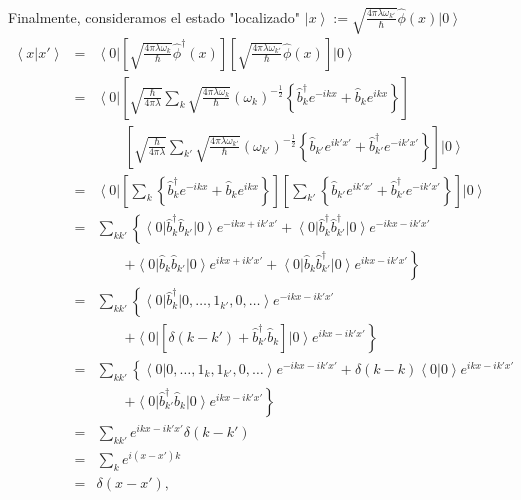 Finalmente, consideramos el estado "localizado" $\left| x\right> :=\sqrt{\frac{4\pi\lambda\omega_{k'}}{\hbar}}\hat{\phi}(x) \left| 0\right> $
\begin{eqnarray}
\left\langle x|  x'\right> & = &\left\langle 0\right| \left[ \sqrt{\frac{4\pi\lambda
\omega_{k}}{\hbar}}\hat{\phi}^{\dagger}(x) \right] \left[\sqrt{\frac{4\pi\lambda\omega_{k'}}{\hbar}}\hat{\phi}(x) \right] \left| 0\right> \\
& = &\left\langle 0\right| \left[ \sqrt{\frac{\hbar}{4\pi\lambda}}\sum_k\sqrt{\frac{4\pi\lambda\omega_{k}}{\hbar}} \left( \omega_{k}\right)
^{-\frac{1}{2}}\left\{ \hat{b}_{k}^{\dagger}e^{-ikx}+\hat{b}_{k}%
e^{ikx}\right\} \right] \nonumber \\
&&\qquad \left[ \sqrt{\frac{\hbar}{4\pi\lambda}}\sum_{k'}\sqrt{\frac{4\pi\lambda\omega_{k'}}{\hbar}}\left( \omega_{k'}\right) ^{-\frac{1}{2}}\left\{ \hat{b}_{k'}e^{ik'x'}+\hat{b}_{k'}^{\dagger}e^{-ik'x'}\right\} \right] \left| 0\right> \\
& = &\left\langle 0\right| \left[ \sum_k\left\{ \hat{b}_{k}^{\dagger
}e^{-ikx}+\hat{b}_{k}e^{ikx}\right\} \right] \left[ \sum_{k'}\left\{ \hat{b}_{k'}e^{ik'x'}+\hat{b}_{k'}^{\dagger}e^{-ik'x'}\right\} \right] \left| 0\right> \\
& = &\sum_{kk'}\left\{\left\langle 0\right| \hat{b}_{k}^{\dagger}\hat{b}_{k'}\left| 0\right> e^{-ikx+ik'x'}+\left\langle 0\right| \hat{b}_{k}^{\dagger}\hat{b}_{k'}^{\dagger}\left| 0\right> e^{-ikx-ik'x'}\right. \nonumber \\
&& \qquad \left.+\left\langle 0\right| \hat{b}_{k}\hat{b}_{k'}\left| 0\right> e^{ikx+ik'x'}
+\left\langle 0\right| \hat{b}_{k}\hat{b}_{k'}^{\dagger}\left| 0\right> e^{ikx-ik'x'}%
\right\} \\
& = &\sum_{kk'}\left\{\left\langle 0\right| \hat{b}_{k}^{\dagger}\left| 0,\dots,1_{k'},0,\dots\right> e^{-ikx-ik'x'} \right.\nonumber \\
&&\qquad \left.+\left\langle 0\right| \left[ \delta(k-k') +\hat{b}_{k'}^{\dagger}\hat{b}_{k}\right] \left| 0\right> e^{ikx-ik'x'}\right\} \\
& = &\sum_{kk'}\left\{\left\langle 0\right| \left. 0,\dots,1_{k},1_{k'},0,\dots\right> e^{-ikx-ik'x'}+\delta\left( k-k\right) \left\langle 0\right| \left. 0\right> e^{ikx-ik'x'}\right. \nonumber \\
&&\qquad\left.+\left\langle 0\right| \hat{b}_{k'}^{\dagger}\hat{b}_{k}\left| 0\right> e^{ikx-ik'x'}\right\} \\
& = &\sum_{kk'}e^{ikx-ik'x'}\delta(k-k') \\
& = &\sum_k e^{i(x-x') k}\\
& = &\delta(x-x') ,
\end{eqnarray}
